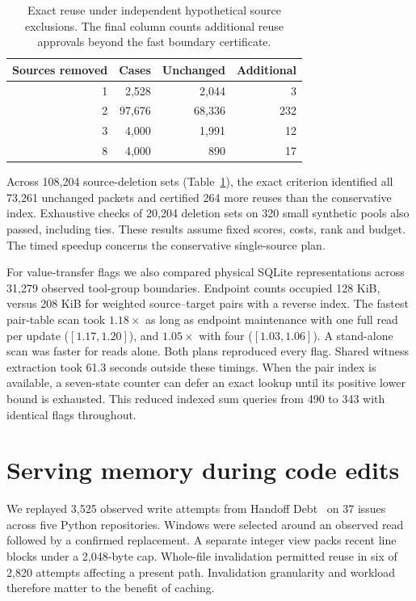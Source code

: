 \documentclass[conference]{IEEEtran}
\begin{document}
\balance
\begin{table}[t]
\caption{Exact reuse under independent hypothetical source exclusions. The final column counts additional reuse approvals beyond the fast boundary certificate.}
\centering\small
\begin{tabular}{rrrr}\toprule
Sources removed & Cases & Unchanged & Additional\\\midrule
1 & 2,528 & 2,044 & 3\\
2 & 97,676 & 68,336 & 232\\
3 & 4,000 & 1,991 & 12\\
8 & 4,000 & 890 & 17\\
\bottomrule\end{tabular}
\label{tab:exclusions}
\end{table}

Across 108,204 source-deletion sets (Table~\ref{tab:exclusions}), the exact criterion identified all 73,261 unchanged packets and certified 264 more reuses than the conservative index. Exhaustive checks of 20,204 deletion sets on 320 small synthetic pools also passed, including ties. These results assume fixed scores, costs, rank and budget. The timed speedup concerns the conservative single-source plan.

For value-transfer flags we also compared physical SQLite representations across 31,279 observed tool-group boundaries. Endpoint counts occupied 128 KiB, versus 208 KiB for weighted source--target pairs with a reverse index. The fastest pair-table scan took $1.18\times$ as long as endpoint maintenance with one full read per update ($[1.17,1.20]$), and $1.05\times$ with four ($[1.03,1.06]$). A stand-alone scan was faster for reads alone. Both plans reproduced every flag. Shared witness extraction took 61.3 seconds outside these timings. When the pair index is available, a seven-state counter can defer an exact lookup until its positive lower bound is exhausted. This reduced indexed sum queries from 490 to 343 with identical flags throughout.

\section{Serving memory during code edits}
We replayed 3,525 observed write attempts from Handoff Debt~\cite{handoff} on 37 issues across five Python repositories. Windows were selected around an observed read followed by a confirmed replacement. A separate integer view packs recent line blocks under a 2,048-byte cap. Whole-file invalidation permitted reuse in six of 2,820 attempts affecting a present path. Invalidation granularity and workload therefore matter to the benefit of caching.
\end{document}
